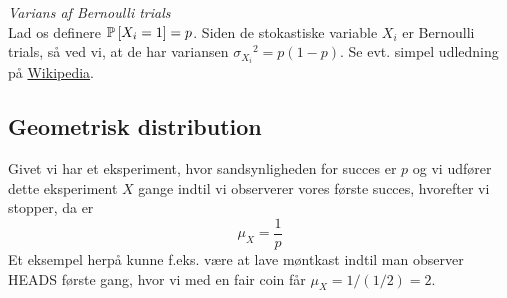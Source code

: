 \textit{Varians af Bernoulli trials}\\
Lad os definere $\P{X_i = 1} = p$. Siden de stokastiske variable $X_i$ er Bernoulli trials, så ved vi, at de har variansen ${\sigma_{X_i}}^2 = p(1-p)$. Se evt. simpel udledning på \href{https://en.wikipedia.org/wiki/Bernoulli_distribution#Variance}{Wikipedia}.


\subsection{Geometrisk distribution} \label{subsec:geometrisk}
Givet vi har et eksperiment, hvor sandsynligheden for succes er $p$ og vi udfører dette eksperiment $X$ gange indtil vi observerer vores første succes, hvorefter vi stopper, da er
$$
\mu_X = \frac{1}{p}
$$
Et eksempel herpå kunne f.eks. være at lave møntkast indtil man observer HEADS første gang, hvor vi med en fair coin får $\mu_X = 1/(1/2) = 2$.
